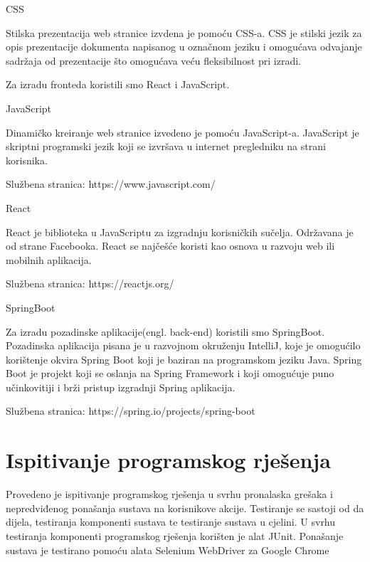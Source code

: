 CSS

Stilska prezentacija web stranice izvdena je pomoću CSS-a.
CSS je stilski jezik za opis prezentacije dokumenta napisanog u označnom jeziku i omogućava odvajanje sadržaja od prezentacije što omogućava veću fleksibilnost pri izradi. 

\vspace{8mm}
Za izradu fronteda koristili smo React i JavaScript. 
\vspace{4mm}

JavaScript

Dinamičko kreiranje web stranice izvedeno je pomoću JavaScript-a. JavaScript je skriptni programski jezik koji se izvršava u internet pregledniku
na strani korisnika.

Službena stranica: https://www.javascript.com/
\vspace{3mm}

React

React je biblioteka u JavaScriptu za izgradnju korisničkih sučelja. Održavana je od strane Facebooka. 
React se najčešće koristi kao osnova u razvoju web ili mobilnih aplikacija. 

Službena stranica: https://reactjs.org/
\vspace{3mm}

SpringBoot

Za izradu pozadinske aplikacije(engl. back-end) koristili smo SpringBoot. Pozadinska aplikacija pisana je u razvojnom okruženju IntelliJ, koje je
omogućilo korištenje okvira Spring Boot koji je baziran na programskom jeziku Java. Spring Boot je projekt koji se oslanja na Spring Framework i koji omogućuje puno učinkovitiji i brži pristup izgradnji Spring aplikacija.

Službena stranica: https://spring.io/projects/spring-boot
\vspace{5mm}

			
			
			\eject 
		
	
		\section{Ispitivanje programskog rješenja}
			
		Provedeno je ispitivanje programskog rješenja u svrhu pronalaska grešaka i nepredviđenog ponašanja sustava na korisnikove akcije. Testiranje se sastoji od da dijela, testiranja komponenti sustava te testiranje sustava u cjelini. U svrhu testiranja komponenti programskog rješenja korišten je alat JUnit. Ponašanje sustava je testirano pomoću alata Selenium WebDriver za Google Chrome
			
